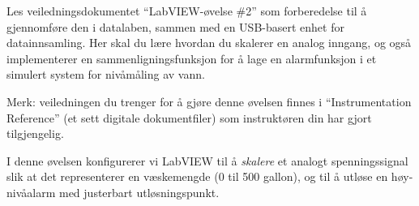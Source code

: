 
Les veiledningsdokumentet ``LabVIEW-øvelse \#2'' som forberedelse til å gjennomføre den i datalaben, sammen med en USB-basert enhet for datainnsamling. Her skal du lære hvordan du skalerer en analog inngang, og også implementerer en sammenligningsfunksjon for å lage en alarmfunksjon i et simulert system for nivåmåling av vann.

\vskip 10pt

Merk: veiledningen du trenger for å gjøre denne øvelsen finnes i ``Instrumentation Reference'' (et sett digitale dokumentfiler) som instruktøren din har gjort tilgjengelig.














I denne øvelsen konfigurerer vi LabVIEW til å {\it skalere} et analogt spenningssignal slik at det representerer en væskemengde (0 til 500 gallon), og til å utløse en høy-nivåalarm med justerbart utløsningspunkt.


